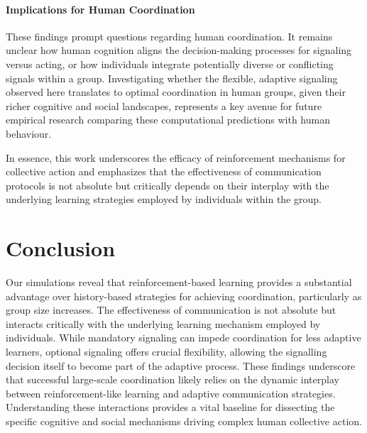 \documentclass[12pt,a4paper]{article}
\begin{document}
\paragraph{Implications for Human Coordination} 
These findings prompt questions regarding human coordination. It remains unclear how human cognition aligns the decision-making processes for signaling versus acting, or how individuals integrate potentially diverse or conflicting signals within a group. Investigating whether the flexible, adaptive signaling observed here translates to optimal coordination in human groups, given their richer cognitive and social landscapes, represents a key avenue for future empirical research comparing these computational predictions with human behaviour.

In essence, this work underscores the efficacy of reinforcement mechanisms for collective action and emphasizes that the effectiveness of communication protocols is not absolute but critically depends on their interplay with the underlying learning strategies employed by individuals within the group.

\section{Conclusion}

Our simulations reveal that reinforcement-based learning provides a substantial advantage over history-based strategies for achieving coordination, particularly as group size increases. The effectiveness of communication is not absolute but interacts critically with the underlying learning mechanism employed by individuals. While mandatory signaling can impede coordination for less adaptive learners, optional signaling offers crucial flexibility, allowing the signalling decision itself to become part of the adaptive process. These findings underscore that successful large-scale coordination likely relies on the dynamic interplay between reinforcement-like learning and adaptive communication strategies. Understanding these interactions provides a vital baseline for dissecting the specific cognitive and social mechanisms driving complex human collective action.
\end{document}
